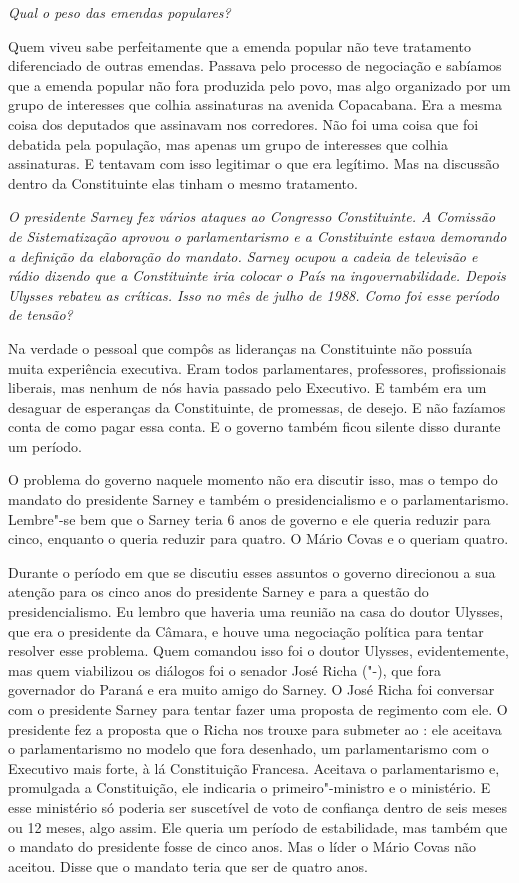 \medskip

\emph{Qual o peso das emendas populares?}

Quem viveu sabe perfeitamente que a emenda popular não
teve tratamento diferenciado de outras emendas. Passava pelo processo de
negociação e sabíamos que a emenda popular não fora produzida pelo povo,
mas algo organizado por um grupo de interesses que colhia assinaturas na
avenida Copacabana. Era a mesma coisa dos deputados que assinavam nos
corredores. Não foi uma coisa que foi debatida pela população, mas
apenas um grupo de interesses que colhia assinaturas. E tentavam com
isso legitimar o que era legítimo. Mas na discussão dentro da
Constituinte elas tinham o mesmo tratamento.

\medskip

\emph{O presidente Sarney fez vários ataques ao Congresso
Constituinte. A Comissão de Sistematização aprovou o parlamentarismo e a
Constituinte estava demorando a definição da elaboração do mandato.
Sarney ocupou a cadeia de televisão e rádio dizendo que a Constituinte
iria colocar o País na ingovernabilidade. Depois Ulysses rebateu as
críticas. Isso no mês de julho de 1988. Como foi esse período de
tensão?}

Na verdade o pessoal que compôs as lideranças na
Constituinte não possuía muita experiência executiva. Eram todos
parlamentares, professores, profissionais liberais, mas nenhum de nós
havia passado pelo Executivo. E também era um desaguar de esperanças da
Constituinte, de promessas, de desejo. E não fazíamos conta de como
pagar essa conta. E o governo também ficou silente disso durante um
período.

O problema do governo naquele momento não era discutir isso, mas o tempo
do mandato do presidente Sarney e também o presidencialismo e o
parlamentarismo. Lembre"-se bem que o Sarney teria 6 anos de governo e
ele queria reduzir para cinco, enquanto o  queria reduzir para
quatro. O Mário Covas e o  queriam quatro.

Durante o período em que se discutiu esses assuntos o governo direcionou
a sua atenção para os cinco anos do presidente Sarney e para a questão
do presidencialismo. Eu lembro que haveria uma reunião na casa do doutor
Ulysses, que era o presidente da Câmara, e houve uma negociação política
para tentar resolver esse problema. Quem comandou isso foi o doutor
Ulysses, evidentemente, mas quem viabilizou os diálogos foi o senador
José Richa ("-), que fora governador do Paraná e era muito amigo do
Sarney. O José Richa foi conversar com o presidente Sarney para tentar
fazer uma proposta de regimento com ele. O presidente fez a proposta que
o Richa nos trouxe para submeter ao : ele aceitava o parlamentarismo
no modelo que fora desenhado, um parlamentarismo com o Executivo mais
forte, à lá Constituição Francesa. Aceitava o parlamentarismo e,
promulgada a Constituição, ele indicaria o primeiro"-ministro e o
ministério. E esse ministério só poderia ser suscetível de voto de
confiança dentro de seis meses ou 12 meses, algo assim. Ele queria um
período de estabilidade, mas também que o mandato do presidente fosse de
cinco anos. Mas o líder o Mário Covas não aceitou. Disse que o mandato
teria que ser de quatro anos.

